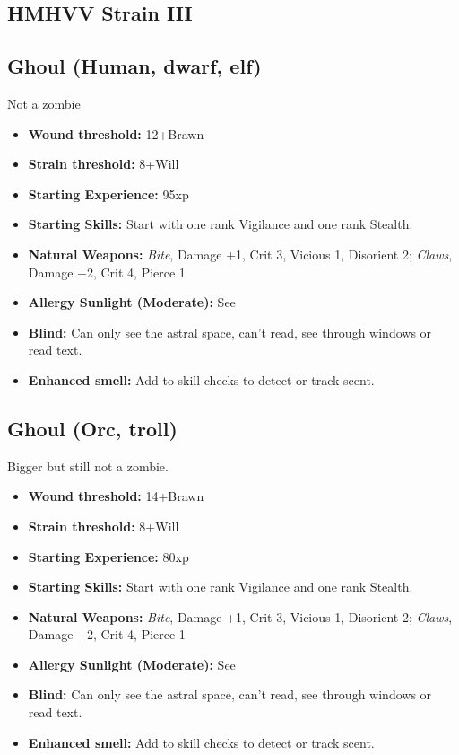 \documentclass{book}
\begin{document}
\subsection{HMHVV Strain III}
\begin{multicols}{2}
	\subsection{Ghoul (Human, dwarf, elf)}
	Not a zombie
	
	\begin{itemize}
		\item \textbf{Wound threshold:} 12+Brawn
		\item \textbf{Strain threshold:} 8+Will
		\item \textbf{Starting Experience:} 95xp
		\item \textbf{Starting Skills:} Start with one rank Vigilance and one rank Stealth.
		\item \textbf{Natural Weapons:} \textit{Bite}, Damage +1, Crit 3, Vicious 1, Disorient 2; \textit{Claws}, Damage +2, Crit 4, Pierce 1
		\item \textbf{Allergy Sunlight (Moderate):} See \pageref{allergysunlight}	
		\item \textbf{Blind:} Can only see the astral space, can't read, see through windows or read text.
		\item \textbf{Enhanced smell:} Add \BoostDie \BoostDie to skill checks to detect or track scent.
	\end{itemize}
	
	\subsection{Ghoul (Orc, troll)}
	Bigger but still not a zombie.
	
	\begin{itemize}
		\item \textbf{Wound threshold:} 14+Brawn
		\item \textbf{Strain threshold:} 8+Will
		\item \textbf{Starting Experience:} 80xp
		\item \textbf{Starting Skills:} Start with one rank Vigilance and one rank Stealth.
		\item \textbf{Natural Weapons:} \textit{Bite}, Damage +1, Crit 3, Vicious 1, Disorient 2; \textit{Claws}, Damage +2, Crit 4, Pierce 1
		\item \textbf{Allergy Sunlight (Moderate):} See \pageref{allergysunlight}	
		\item \textbf{Blind:} Can only see the astral space, can't read, see through windows or read text.
		\item \textbf{Enhanced smell:} Add \BoostDie \BoostDie to skill checks to detect or track scent.	
	\end{itemize}
	
\end{multicols}
\end{document}
